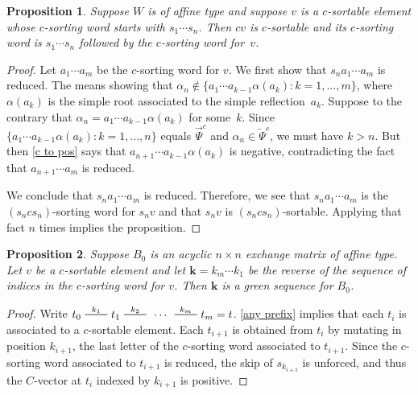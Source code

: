 \documentclass{amsart}
\newtheorem{proposition}{Proposition}[section]
\theoremstyle{definition}
\theoremstyle{remark}
\numberwithin{equation}{section}
\newcommand{\edge}{\,\,\rule[2.7pt]{20pt}{0.5pt}\,\,}
\newcommand{\set}[1]{{\lbrace #1 \rbrace}}
\newcommand{\0}{{\mathbf{0}}}
\newcommand{\kk}{{\boldsymbol{k}}}
\newcommand{\TravInfChar}{\Psi}
\newcommand{\TravProj}[1]{\overrightarrow{\TravInfChar}^{#1}}
\newcommand{\TravInj}[1]{\overleftarrow{\TravInfChar}^{#1}}
\begin{document}
\begin{proposition}\label{tack on c}
Suppose $W$ is of affine type and suppose $v$ is a $c$-sortable element whose $c$-sorting word starts with $s_1\cdots s_n$.
Then $cv$ is $c$-sortable and its $c$-sorting word is $s_1\cdots s_n$ followed by the $c$-sorting word for~$v$.
\end{proposition}
\begin{proof}
Let $a_1\cdots a_m$ be the $c$-sorting word for $v$.
We first show that $s_na_1\cdots a_m$ is reduced.
  The means showing that $\alpha_n\not\in\set{a_1\cdots a_{k-1}\alpha(a_k):k=1,\ldots,m}$, where $\alpha(a_k)$ is the simple root associated to the simple reflection~$a_k$.
Suppose to the contrary that $\alpha_n=a_1\cdots a_{k-1}\alpha(a_k)$ for some~$k$.
Since $\set{a_1\cdots a_{k-1}\alpha(a_k):k=1,\ldots,n}$ equals $\TravProj{c}$ and $\alpha_n\in \TravInj{c}$, we must have $k>n$.
But then \cref{c to pos} says that $a_{n+1}\cdots a_{k-1}\alpha(a_k)$ is negative, contradicting the fact that $a_{n+1}\cdots a_m$ is reduced.

We conclude that $s_na_1\cdots a_m$ is reduced.
Therefore, we see that $s_na_1\cdots a_m$ is the $(s_ncs_n)$-sorting word for $s_nv$ and that $s_nv$ is $(s_ncs_n)$-sortable.
Applying that fact $n$ times implies the proposition.
\end{proof}

\begin{proposition}\label{sort green}
Suppose $B_0$ is an acyclic $n\times n$ exchange matrix of affine type.
Let $v$ be a $c$-sortable element and let $\kk=k_m\cdots k_1$ be the \emph{reverse} of the sequence of indices in the $c$-sorting word for $v$.
Then $\kk$ is a green sequence for $B_0$.
\end{proposition}
\begin{proof}
Write $t_0\overset{k_1}{\edge}t_1\overset{k_2}{\edge}\,\cdots\,\overset{k_m}{\edge}t_m=t$.
\cref{any prefix} implies that each $t_i$ is associated to a $c$-sortable element.
Each $t_{i+1}$ is obtained from $t_i$ by mutating in position $k_{i+1}$, the last letter of the $c$-sorting word associated to $t_{i+1}$.
Since the $c$-sorting word associated to $t_{i+1}$ is reduced, the skip of $s_{k_{i+1}}$ is unforced, and thus the $C$-vector at $t_i$ indexed by $k_{i+1}$ is positive.
\end{proof}
\end{document}
